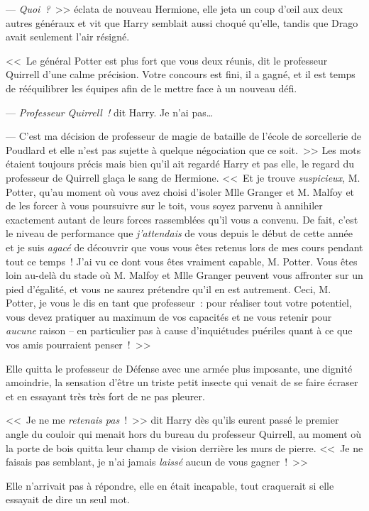 --- \emph{Quoi~?}~>> éclata de nouveau Hermione, elle jeta un coup d'œil aux deux autres généraux et vit que Harry semblait aussi choqué qu'elle, tandis que Drago avait seulement l'air résigné.

<<~Le général Potter est plus fort que vous deux réunis, dit le professeur Quirrell d'une calme précision. Votre concours est fini, il a gagné, et il est temps de rééquilibrer les équipes afin de le mettre face à un nouveau défi.

--- \emph{Professeur Quirrell~!} dit Harry. Je n'ai pas…

--- C'est ma décision de professeur de magie de bataille de l'école de sorcellerie de Poudlard et elle n'est pas sujette à quelque négociation que ce soit.~>> Les mots étaient toujours précis mais bien qu'il ait regardé Harry et pas elle, le regard du professeur de Quirrell glaça le sang de Hermione. <<~Et je trouve \emph{suspicieux}, M. Potter, qu'au moment où vous avez choisi d'isoler Mlle Granger et M. Malfoy et de les forcer à vous poursuivre sur le toit, vous soyez parvenu à annihiler exactement autant de leurs forces rassemblées qu'il vous a convenu. De fait, c'est le niveau de performance que \emph{j'attendais} de vous depuis le début de cette année et je suis \emph{agacé} de découvrir que vous vous êtes retenus lors de mes cours pendant tout ce temps~! J'ai vu ce dont vous êtes vraiment capable, M. Potter. Vous êtes loin au-delà du stade où M. Malfoy et Mlle Granger peuvent vous affronter sur un pied d'égalité, et vous ne saurez prétendre qu'il en est autrement. Ceci, M. Potter, je vous le dis en tant que professeur~: pour réaliser tout votre potentiel, vous devez pratiquer au maximum de vos capacités et ne vous retenir pour \emph{aucune} raison -- en particulier pas à cause d'inquiétudes puériles quant à ce que vos amis pourraient penser~!~>>

\later

Elle quitta le professeur de Défense avec une armée plus imposante, une dignité amoindrie, la sensation d'être un triste petit insecte qui venait de se faire écraser et en essayant très très fort de ne pas pleurer.

<<~Je ne me \emph{retenais pas}~!~>> dit Harry dès qu'ils eurent passé le premier angle du couloir qui menait hors du bureau du professeur Quirrell, au moment où la porte de bois quitta leur champ de vision derrière les murs de pierre. <<~Je ne faisais pas semblant, je n'ai jamais \emph{laissé} aucun de vous gagner~!~>>

Elle n'arrivait pas à répondre, elle en était incapable, tout craquerait si elle essayait de dire un seul mot.

